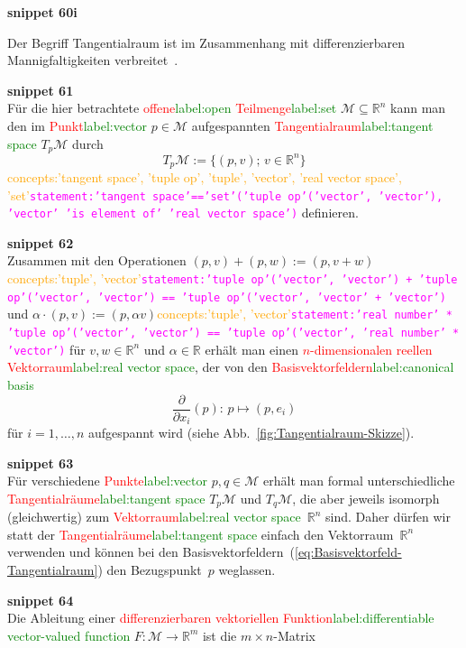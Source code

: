 \documentclass[a4paper,twoside,english,ngerman,deutsch,german,sectrefs,envcountsame,envcountchap]{svmono}
\newcommand{\setref}[2]{\textcolor{red}{#1}\textcolor{green}{#2}}
\newcommand{\snippet}[1]{\textbf{snippet #1}\\}
\newcommand{\eqnote}[2]{\textcolor{orange}{#1}\textcolor{magenta}{\texttt{#2}}}
\begin{document}
\snippet{60i}
\begin{remark}
[Tangentialraum]\label{rem:tangentialraum}Der Begriff Tangentialraum
ist im Zusammenhang mit differenzierbaren Mannigfaltigkeiten verbreitet~\cite{abraham1983,jaenich2005,lee2006}.

\snippet{61}
Für die hier betrachtete \setref{offene}{label:open} \setref{Teilmenge}{label:set} $\mathcal{M}\subseteq{\mathbb{R}}^{n}$
kann man den im \setref{Punkt}{label:vector} $p\in\mathcal{M}$ aufgespannten \setref{Tangentialraum}{label:tangent space}
$T_{p}\mathcal{M}$ durch
\[
T_{p}\mathcal{M}:=\{(p,v);\,v\in{\mathbb{R}}^{n}\}
\]\eqnote{concepts:'tangent space', 'tuple op', 'tuple', 'vector', 'real vector space', 'set'}{statement:'tangent space'=='set'('tuple op'('vector', 'vector'), 'vector' 'is element of' 'real vector space')}
definieren.

\snippet{62}
Zusammen mit den Operationen $(p,v)+(p,w):=(p,v+w)$\eqnote{concepts:'tuple', 'vector'}{statement:'tuple op'('vector', 'vector') + 'tuple op'('vector', 'vector') == 'tuple op'('vector', 'vector' + 'vector')} und
$\alpha\cdot(p,v):=(p,\alpha v)$\eqnote{concepts:'tuple', 'vector'}{statement:'real number' * 'tuple op'('vector', 'vector') == 'tuple op'('vector', 'real number' * 'vector')} für $v,w\in{\mathbb{R}}^{n}$ und $\alpha\in{\mathbb{R}}$
erhält man einen \setref{$n$-dimensionalen reellen Vektorraum}{label:real vector space}, der von den
\setref{Basisvektorfeldern}{label:canonical basis}
\begin{equation}
\frac{\partial}{\partial x_{i}}(p):\,p\mapsto(p,e_{i})\label{eq:Basisvektorfeld-Tangentialraum}
\end{equation}
für $i=1,\ldots,n$ aufgespannt wird (siehe Abb.~\ref{fig:Tangentialraum-Skizze}).

\snippet{63}
Für verschiedene \setref{Punkte}{label:vector} $p,q\in\mathcal{M}$ erhält man formal unterschiedliche \setref{Tangentialräume}{label:tangent space} $T_{p}\mathcal{M}$ und $T_{q}\mathcal{M}$, die aber jeweils isomorph (gleichwertig) zum \setref{Vektorraum}{label:real vector space}~${\mathbb{R}}^{n}$ sind. Daher dürfen wir statt der \setref{Tangentialräume}{label:tangent space} einfach den Vektor\-raum~$\mathbb{R}^{n}$ verwenden und können bei den Basisvektorfeldern~(\ref{eq:Basisvektorfeld-Tangentialraum}) den Bezugspunkt~$p$ weglassen.
\end{remark}


\snippet{64}

Die Ableitung einer \setref{differenzierbaren vektoriellen
Funktion}{label:differentiable vector-valued function} $F:\mathcal{M}\to{\mathbb{R}}^{m}$ ist die $m\times n$-Matrix
\end{document}
